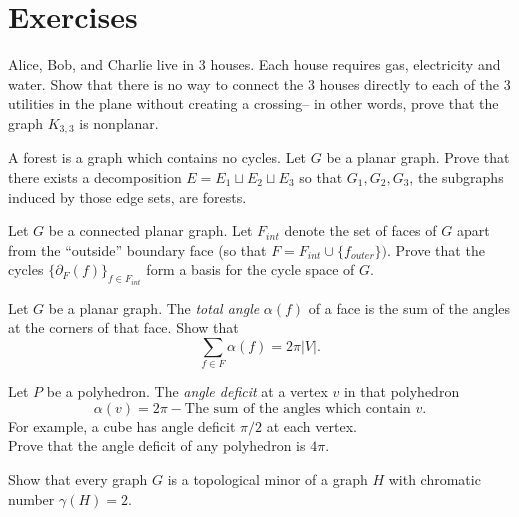 \section{Exercises}

\begin{exercise}
Alice, Bob, and Charlie live in 3 houses. Each house requires gas, electricity and water. Show that there is no way to connect the 3 houses directly to each of the 3 utilities in the plane without creating a crossing-- in other words, prove that the graph $K_{3,3}$ is nonplanar. 
\label{exer:utilities}
\end{exercise}

\begin{exercise} 
A forest is a graph which contains no cycles. Let $G$ be a planar graph. Prove that there exists a decomposition $E=E_1\sqcup E_2\sqcup E_3$ so that $G_1, G_2, G_3$, the subgraphs induced by those edge sets, are forests.
\label{exer:planarforest}
\end{exercise}
\begin{exercise} 
    Let $G$ be a connected planar graph. Let $F_{int}$ denote the set of faces of $G$ apart from the ``outside'' boundary face (so that $F= F_{int}\cup\{f_{outer}\})$. Prove that the cycles $\{\partial_F(f)\}_{f\in F_{int}}$ form a basis for the cycle space of $G$. 
    \label{exer:facebasis}
    \end{exercise}
    

\begin{exercise}
Let $G$ be a planar graph. The \emph{total angle} $\alpha(f)$ of a face is the sum of the  angles at the corners of that face. Show that 
\[\sum_{f\in F} \alpha(f) = 2\pi |V|.\]
\label{exer:totalangleplanar}
\end{exercise}

\begin{exercise}
Let $P$ be a polyhedron. The \emph{angle deficit} at a vertex $v$ in that polyhedron 
\[\alpha(v)=2\pi- \text{The sum of the angles which contain $v$.}\]
For example, a cube has angle deficit $\pi/2$ at each vertex.\\
Prove that the angle deficit of any polyhedron is $4\pi$. 

\label{exer:angledeficit}
\end{exercise}

\begin{exercise}
Show that every graph $G$ is a topological minor of a graph $H$ with chromatic number $\gamma(H)=2$. 
\label{exer:topologicalminorbipartite}
\end{exercise}

